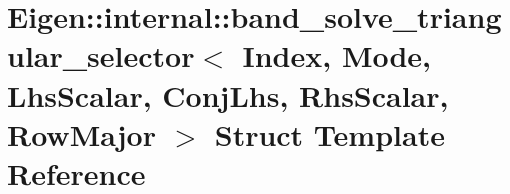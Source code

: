 \hypertarget{struct_eigen_1_1internal_1_1band__solve__triangular__selector_3_01_index_00_01_mode_00_01_lhs_scb3f84b84f0cb728030fb1bbaaacae5f9}{}\section{Eigen\+:\+:internal\+:\+:band\+\_\+solve\+\_\+triangular\+\_\+selector$<$ Index, Mode, Lhs\+Scalar, Conj\+Lhs, Rhs\+Scalar, Row\+Major $>$ Struct Template Reference}
\label{struct_eigen_1_1internal_1_1band__solve__triangular__selector_3_01_index_00_01_mode_00_01_lhs_scb3f84b84f0cb728030fb1bbaaacae5f9}
